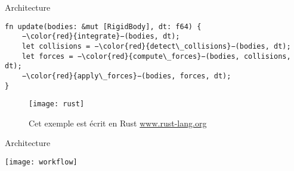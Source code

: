 \begin{frame}[fragile]{Architecture}
\begin{lstlisting}
fn update(bodies: &mut [RigidBody], dt: f64) {
    −\color{red}{integrate}−(bodies, dt);
    let collisions = −\color{red}{detect\_collisions}−(bodies, dt);
    let forces = −\color{red}{compute\_forces}−(bodies, collisions, dt);
    −\color{red}{apply\_forces}−(bodies, forces, dt);
}
\end{lstlisting}

 {
    \begin{figure}[h]
        \begin{center}
            \texttt{[image: rust]}
            \caption{Cet exemple est écrit en Rust \href{www.rust-lang.org}{www.rust-lang.org}}
        \end{center}
    \end{figure}
}

\end{frame}

\begin{frame}[fragile]{Architecture}
\vfill
\begin{center}
\texttt{[image: workflow]}
\end{center}
\vfill
\end{frame}
